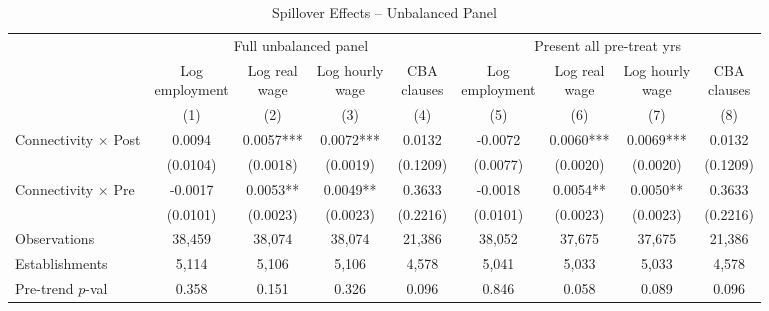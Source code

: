 \begin{table}[H]
\centering
\scriptsize
\caption{Spillover Effects -- Unbalanced Panel}
\begin{tabular}{lcccccccc}
\toprule
& \multicolumn{4}{c}{Full unbalanced panel} & \multicolumn{4}{c}{Present all pre-treat yrs} \\
\cmidrule(lr){2-5} \cmidrule(lr){6-9}
& \shortstack{Log\\employment} & \shortstack{Log real\\wage} & \shortstack{Log hourly\\wage} & \shortstack{CBA\\clauses} & \shortstack{Log\\employment} & \shortstack{Log real\\wage} & \shortstack{Log hourly\\wage} & \shortstack{CBA\\clauses} \\
& (1) & (2) & (3) & (4) & (5) & (6) & (7) & (8) \\
\midrule
Connectivity $\times$ Post & 0.0094 & 0.0057*** & 0.0072*** & 0.0132 & -0.0072 & 0.0060*** & 0.0069*** & 0.0132 \\
& (0.0104) & (0.0018) & (0.0019) & (0.1209) & (0.0077) & (0.0020) & (0.0020) & (0.1209) \\[3pt]
Connectivity $\times$ Pre & -0.0017 & 0.0053** & 0.0049** & 0.3633 & -0.0018 & 0.0054** & 0.0050** & 0.3633 \\
& (0.0101) & (0.0023) & (0.0023) & (0.2216) & (0.0101) & (0.0023) & (0.0023) & (0.2216) \\[3pt]
\midrule
Observations & 38,459 & 38,074 & 38,074 & 21,386 & 38,052 & 37,675 & 37,675 & 21,386 \\
Establishments & 5,114 & 5,106 & 5,106 & 4,578 & 5,041 & 5,033 & 5,033 & 4,578 \\
Pre-trend $p$-val & 0.358 & 0.151 & 0.326 & 0.096 & 0.846 & 0.058 & 0.089 & 0.096 \\
\bottomrule
\end{tabular}
\begin{minipage}{\textwidth}
\footnotesize
\medskip

\end{minipage}
\end{table}
